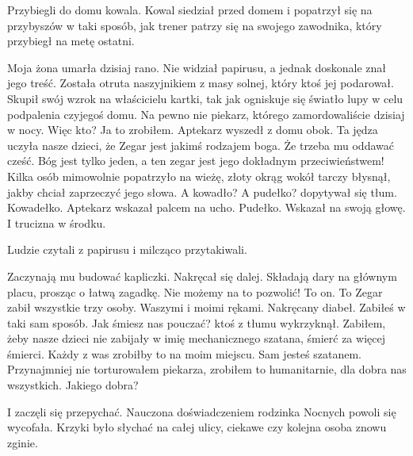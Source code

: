 Przybiegli do domu kowala.
Kowal siedział przed domem i popatrzył się na przybyszów w taki sposób, jak trener patrzy się na swojego zawodnika, który przybiegł na metę ostatni.
\begin{dialogue}
	\ds{} Moja żona umarła dzisiaj rano. \dm{} 
		Nie widział papirusu, a jednak doskonale znał jego treść. \dm{} 
		Została otruta naszyjnikiem z masy solnej, który ktoś jej podarował. \dm{}
		Skupił swój wzrok na właścicielu kartki, tak jak ogniskuje się światło lupy w celu podpalenia czyjegoś domu. \dm{} 
		Na pewno nie piekarz, którego zamordowaliście dzisiaj w nocy. Więc kto?
	\ds{} Ja to zrobiłem. \dm{} 
		Aptekarz wyszedł z domu obok. \dm{} 
		Ta jędza uczyła nasze dzieci, że Zegar jest jakimś rodzajem boga. Że trzeba mu oddawać cześć. Bóg jest tylko jeden, a ten zegar jest jego dokładnym przeciwieństwem! \dm{} 
		Kilka osób mimowolnie popatrzyło na wieżę, złoty okrąg wokół tarczy błysnął, jakby chciał zaprzeczyć jego słowa.
	\ds{} A kowadło? A pudełko? \dm{} 
		dopytywał się tłum.
	\ds{} Kowadełko. \dm{} Aptekarz wskazał palcem na ucho. \dm{} Pudełko. \dm{} Wskazał na swoją głowę. \dm{} I trucizna w środku.
\end{dialogue}
Ludzie czytali z papirusu i milcząco przytakiwali.
\begin{dialogue}
	\ds{} Zaczynają mu budować kapliczki. \dm{} 
		Nakręcał się dalej. \dm{}
		Składają dary na głównym placu, prosząc o łatwą zagadkę. Nie możemy na to pozwolić! To on. To Zegar zabił wszystkie trzy osoby. Waszymi i moimi rękami. Nakręcany diabeł.
	\ds{} Zabiłeś w taki sam sposób. Jak śmiesz nas pouczać? \dm{} 
		ktoś z tłumu wykrzyknął.
	\ds{} Zabiłem, żeby nasze dzieci nie zabijały w imię mechanicznego szatana, śmierć za więcej śmierci. Każdy z was zrobiłby to na moim miejscu.
	\ds{} Sam jesteś szatanem. 
	\ds{} Przynajmniej nie torturowałem piekarza, zrobiłem to humanitarnie, dla dobra nas wszystkich.
	\ds{} Jakiego dobra?
\end{dialogue}
I zaczęli się przepychać.
Nauczona doświadczeniem rodzinka Nocnych powoli się wycofała.
Krzyki było słychać na całej ulicy, ciekawe czy kolejna osoba znowu zginie.


